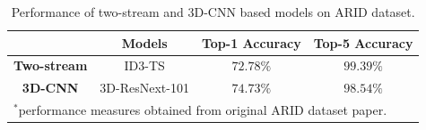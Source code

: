 \documentclass[conference]{IEEEtran}
\begin{document}
\begin{table}[H]
\caption{Performance of two-stream and 3D-CNN based models on ARID dataset.}
\begin{center}
\begin{tabular}{|c|c|c|c|}
\hline
& \textbf{Models} & \textbf{Top-1 Accuracy} & \textbf{Top-5 Accuracy}\\
\hline 
\textbf{Two-stream} & ID3-TS & $72.78\%$ & $99.39\%$ \\
\hline
\textbf{3D-CNN} & 3D-ResNext-101 & $74.73\%$ & $98.54\%$ \\
\hline
\multicolumn{4}{l}{$^{\mathrm{*}}$performance measures obtained from original ARID dataset paper.}
\end{tabular}
\label{tabARIDBaeline}
\end{center}
\end{table}




\end{document}
